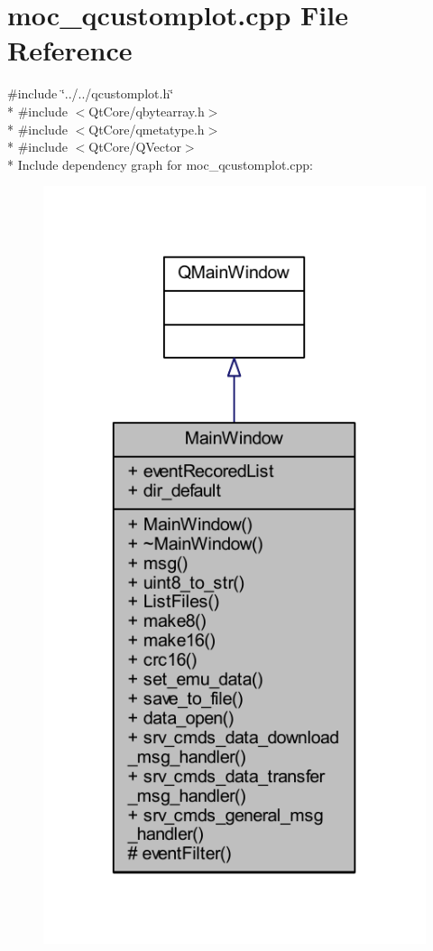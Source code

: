 \hypertarget{a00067}{\section{moc\+\_\+qcustomplot.\+cpp File Reference}
\label{a00067}
}
{\ttfamily \#include \char`\"{}../../qcustomplot.\+h\char`\"{}}\\*
{\ttfamily \#include $<$Qt\+Core/qbytearray.\+h$>$}\\*
{\ttfamily \#include $<$Qt\+Core/qmetatype.\+h$>$}\\*
{\ttfamily \#include $<$Qt\+Core/\+Q\+Vector$>$}\\*
Include dependency graph for moc\+\_\+qcustomplot.\+cpp\+:
\nopagebreak
\begin{figure}[H]
\begin{center}
\leavevmode
\includegraphics[width=350pt]{da/ddc/a00288}
\end{center}
\end{figure}

